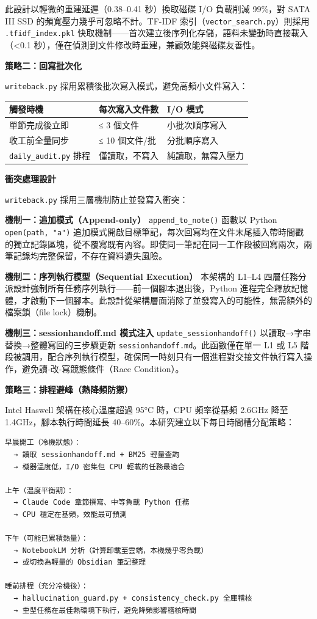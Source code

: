 此設計以輕微的重建延遲（0.38--0.41 秒）換取磁碟 I/O 負載削減 99\%，對
SATA III SSD 的頻寬壓力幾乎可忽略不計。TF-IDF
索引（\texttt{vector\_search.py}）則採用 \texttt{.tfidf\_index.pkl}
快取機制------首次建立後序列化存儲，語料未變動時直接載入（\textless0.1
秒），僅在偵測到文件修改時重建，兼顧效能與磁碟友善性。

\textbf{策略二：回寫批次化}

\texttt{writeback.py} 採用累積後批次寫入模式，避免高頻小文件寫入：

{\def\LTcaptype{none} %
\begin{longtable}[]{@{}lll@{}}
\toprule\noalign{}
觸發時機 & 每次寫入文件數 & I/O 模式 \\
\midrule\noalign{}
\endhead
\bottomrule\noalign{}
\endlastfoot
單節完成後立即 & ≤ 3 個文件 & 小批次順序寫入 \\
收工前全量同步 & ≤ 10 個文件/批 & 分批順序寫入 \\
\texttt{daily\_audit.py} 排程 & 僅讀取，不寫入 & 純讀取，無寫入壓力 \\
\end{longtable}
}

\textbf{衝突處理設計}

\texttt{writeback.py} 採用三層機制防止並發寫入衝突：

\textbf{機制一：追加模式（Append-only）} \texttt{append\_to\_note()}
函數以 Python \texttt{open(path,\ "a")}
追加模式開啟目標筆記，每次回寫均在文件末尾插入帶時間戳的獨立記錄區塊，從不覆寫既有內容。即使同一筆記在同一工作段被回寫兩次，兩筆記錄均完整保留，不存在資料遺失風險。

\textbf{機制二：序列執行模型（Sequential Execution）} 本架構的 L1--L4
四層任務分派設計強制所有任務序列執行------前一個腳本退出後，Python
進程完全釋放記憶體，才啟動下一個腳本。此設計從架構層面消除了並發寫入的可能性，無需額外的檔案鎖（file
lock）機制。

\textbf{機制三：sessionhandoff.md 模式注入}
\texttt{update\_sessionhandoff()} 以讀取→字串替換→整體寫回的三步驟更新
\texttt{sessionhandoff.md}。此函數僅在單一 L1 或 L5
階段被調用，配合序列執行模型，確保同一時刻只有一個進程對交接文件執行寫入操作，避免讀-改-寫競態條件（Race
Condition）。

\textbf{策略三：排程避峰（熱降頻防禦）}

Intel Haswell 架構在核心溫度超過 95°C 時，CPU 頻率從基頻 2.6GHz 降至
1.4GHz，腳本執行時間延長 40--60\%。本研究建立以下每日時間槽分配策略：

\begin{verbatim}
早晨開工（冷機狀態）：
  → 讀取 sessionhandoff.md + BM25 輕量查詢
  → 機器溫度低，I/O 密集但 CPU 輕載的任務最適合

上午（溫度平衡期）：
  → Claude Code 章節撰寫、中等負載 Python 任務
  → CPU 穩定在基頻，效能最可預測

下午（可能已累積熱量）：
  → NotebookLM 分析（計算卸載至雲端，本機幾乎零負載）
  → 或切換為輕量的 Obsidian 筆記整理

睡前排程（充分冷機後）：
  → hallucination_guard.py + consistency_check.py 全庫稽核
  → 重型任務在最佳熱環境下執行，避免降頻影響稽核時間
\end{verbatim}

